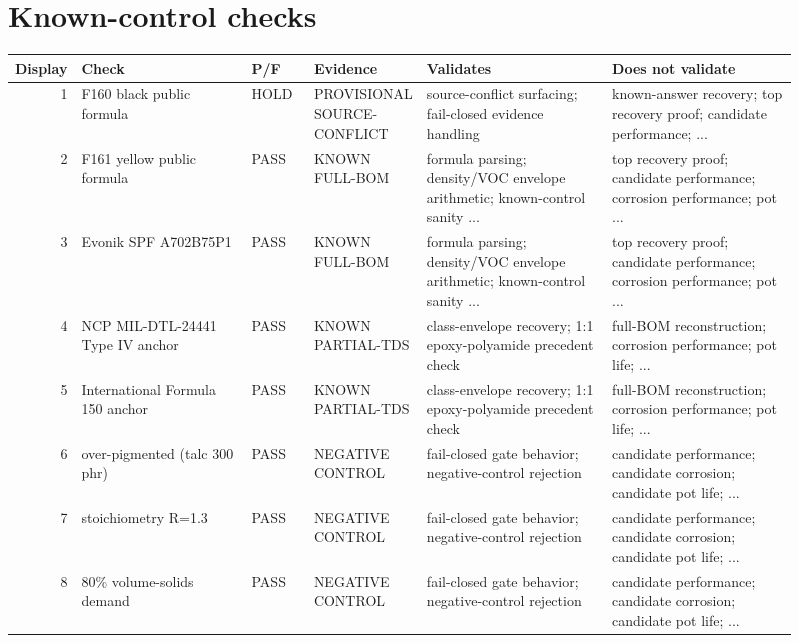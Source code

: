 \documentclass[10pt]{article}
\begin{document}
\section{Known-control checks}
{\scriptsize\begin{longtable}{@{}r p{0.22\linewidth} p{0.08\linewidth} p{0.13\linewidth} p{0.24\linewidth} p{0.24\linewidth}@{}}\toprule \textbf{Display} & \textbf{Check} & \textbf{P/F} & \textbf{Evidence} & \textbf{Validates} & \textbf{Does not validate} \\ \midrule 1 & F160 black public formula & HOLD & PROVISIONAL SOURCE-CONFLICT & source-conflict surfacing; fail-closed evidence handling & known-answer recovery; top recovery proof; candidate performance; ... \\ 2 & F161 yellow public formula & PASS & KNOWN FULL-BOM & formula parsing; density/VOC envelope arithmetic; known-control sanity ... & top recovery proof; candidate performance; corrosion performance; pot ... \\ 3 & Evonik SPF A702B75P1 & PASS & KNOWN FULL-BOM & formula parsing; density/VOC envelope arithmetic; known-control sanity ... & top recovery proof; candidate performance; corrosion performance; pot ... \\ 4 & NCP MIL-DTL-24441 Type IV anchor & PASS & KNOWN PARTIAL-TDS & class-envelope recovery; 1:1 epoxy-polyamide precedent check & full-BOM reconstruction; corrosion performance; pot life; ... \\ 5 & International Formula 150 anchor & PASS & KNOWN PARTIAL-TDS & class-envelope recovery; 1:1 epoxy-polyamide precedent check & full-BOM reconstruction; corrosion performance; pot life; ... \\ 6 & over-pigmented (talc 300 phr) & PASS & NEGATIVE CONTROL & fail-closed gate behavior; negative-control rejection & candidate performance; candidate corrosion; candidate pot life; ... \\ 7 & stoichiometry R=1.3 & PASS & NEGATIVE CONTROL & fail-closed gate behavior; negative-control rejection & candidate performance; candidate corrosion; candidate pot life; ... \\ 8 & 80\% volume-solids demand & PASS & NEGATIVE CONTROL & fail-closed gate behavior; negative-control rejection & candidate performance; candidate corrosion; candidate pot life; ... \\ \bottomrule\end{longtable}}
\newpage
\end{document}
